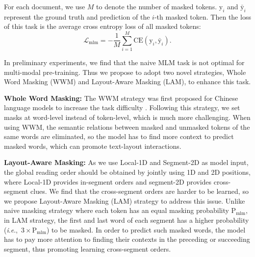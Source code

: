 \documentclass[11pt]{article}
\newcommand{\ie}{\textit{i}.\textit{e}.,\ }
\begin{document}
For each document,  we use $M$ to denote the number of masked tokens.  $\mathrm{y}_i$ and $\mathrm{\bar{y}}_i$ represent the ground truth and prediction of the $i$-th masked token. Then the loss of this task is the average cross entropy loss of all masked tokens:
\begin{equation}
\label{equ:mlm}
\mathcal{L}_\mathrm{mlm}= 
- \frac{1}{M}
 \sum_{i=1}^{M} 
 \mathrm{CE}(\mathrm{y}_i, \mathrm{\bar{y}}_i).
\end{equation}

In preliminary experiments, we find that the naive MLM  task is not optimal for multi-modal pre-training.
Thus we propose to adopt two novel strategies, Whole Word Masking (WWM) and Layout-Aware Masking (LAM), to enhance this task.
  
\noindent\textbf{Whole Word Masking:}
The WWM strategy was first proposed for Chinese language models to increase the task difficulty \citep{cui2021pre}.
Following this strategy,  we set masks at word-level instead of token-level, which is much more challenging.
When using WWM, the semantic relations between masked and unmasked tokens of the same words are eliminated, so the model has to find more context to predict masked words, which can promote text-layout interactions.  

\noindent\textbf{Layout-Aware Masking:}
As we use Local-1D and Segment-2D as model input, the global reading order should be obtained by jointly using 1D and 2D positions, where Local-1D provides in-segment orders and segment-2D provides cross-segment clues.
We find that the cross-segment orders are harder to be learned, so we propose Layout-Aware Masking (LAM) strategy to address this issue.
Unlike naive masking strategy where each token has an equal masking probability $\mathrm{P}_\mathrm{mlm}$,  in LAM strategy, the first and last word of each segment has a higher probability (\ie $3\times\mathrm{P}_\mathrm{mlm}$) to be masked. 
In order to predict such masked words, the model has to pay more attention to finding their contexts in the preceding or succeeding segment, thus promoting learning cross-segment orders.   
\end{document}
